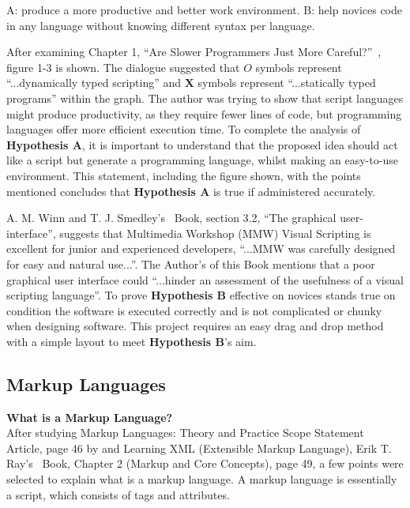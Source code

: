 \documentclass[conference]{IEEEtran}
\begin{document}
        \begin{center}
           A: produce a more productive and better work environment.
           B: help novices code in any language without knowing different syntax per language.
        \end{center}
        
        After examining Chapter 1, ``Are Slower Programmers Just More Careful?''~\cite{dr_caitlin_sadowski_rethinking_2019}, figure 1-3 is shown. The dialogue suggested that $O$ symbols represent ``...dynamically typed scripting'' and $\mathbf{X}$ symbols represent ``...statically typed programs'' within the graph. The author was trying to show that script languages might produce productivity, as they require fewer lines of code, but programming languages offer more efficient execution time. To complete the analysis of \textbf{Hypothesis A}, it is important to understand that the proposed idea should act like a script but generate a programming language, whilst making an easy-to-use environment. This statement, including the figure shown, with the points mentioned concludes that \textbf{Hypothesis A} is true if administered accurately.

        A. M. Winn and T. J. Smedley’s~\cite{winn_multimedia_1998} Book, section 3.2, ``The graphical user-interface'',  suggests that Multimedia Workshop (MMW) Visual Scripting is excellent for junior and experienced developers, ``...MMW was carefully designed for easy and natural use...''. The Author’s of this Book mentions that a poor graphical user interface could ``...hinder an assessment of the usefulness of a visual scripting language''. To prove \textbf{Hypothesis B} effective on novices stands true on condition the software is executed correctly and is not complicated or chunky when designing software. This project requires an easy drag and drop method with a simple layout to meet \textbf{Hypothesis B}’s aim.

      \subsection{Markup Languages}
      \label{subsec:lr-markupLanguages}
        \textbf{What is a Markup Language?}\\
          After studying Markup Languages: Theory and Practice Scope Statement~\cite{noauthor_markup_1999} Article, page 46 by and Learning XML (Extensible Markup Language), Erik T. Ray's~\cite{ray_learning_nodate} Book, Chapter 2 (Markup and Core Concepts), page 49, a few points were selected to explain what is a markup language. A markup language is essentially a script, which consists of tags and attributes. 
\end{document}
